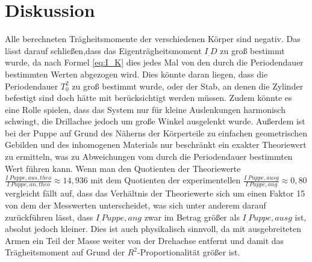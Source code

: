 \section{Diskussion}
\label{sec:Diskussion}
Alle berechneten Trägheitsmomente der verschiedenen Körper sind negativ.
Das lässt darauf schließen,dass das Eigenträgheitsmoment $I_.D$ zu groß bestimmt wurde, da nach Formel \eqref{eq:I_K} dies jedes Mal von den durch die Periodendauer bestimmten Werten abgezogen wird.\newline
Dies könnte daran liegen, dass die Periodendauer $T_0^2$ zu groß bestimmt wurde, oder der Stab, an denen die Zylinder befestigt sind doch hätte mit berücksichtigt werden müssen. Zudem könnte es eine Rolle spielen, dass das System nur für kleine Auslenkungen harmonisch schwingt, die Drillachse jedoch um große Winkel ausgelenkt wurde.\newline
Außerdem ist bei der Puppe auf Grund des Näherns der Körperteile zu einfachen geometrischen Gebilden und des inhomogenen Materials nur beschränkt ein exakter Theoriewert zu ermitteln, was zu Abweichungen vom durch die Periodendauer bestimmten Wert führen kann.
Wenn man den Quotienten der Theoriewerte $\frac{I_.{Puppe,aus,theo}}{I_.{Puppe,an,theo}}\approx 14,936$
mit dem Quotienten der experimentellen $\frac{I_.{Puppe,ausg}}{I_.{Puppe,ang}}\approx0,80$
vergleicht fällt auf, dass das Verhältnis der Theoriewerte sich um einen Faktor 15 von dem der Messwerten unterscheidet, was sich unter anderem darauf zurückführen lässt, dass $I_.{Puppe,ang}$ zwar im Betrag größer als $I_.{Puppe,ausg}$ ist, absolut jedoch kleiner. Dies ist auch physikalisch sinnvoll, da mit ausgebreiteten Armen ein Teil der Masse weiter von der Drehachse entfernt und damit das Trägheitsmoment auf Grund der $R^2$-Proportionalität größer ist.